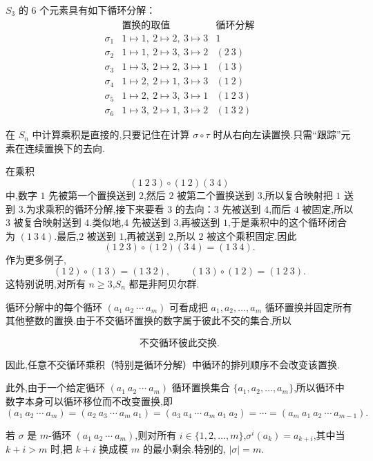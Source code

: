 \begin{example}
	$S_3$ 的 $6$ 个元素具有如下循环分解：
\[
\begin{array}{c|c|c}
	& \text{置换的取值} & \text{循环分解}\\ \hline
	\sigma_1&1\mapsto1,\ 2\mapsto2,\ 3\mapsto3&1\\
	\sigma_2&1\mapsto1,\ 2\mapsto3,\ 3\mapsto2&(2\ 3)\\
	\sigma_3&1\mapsto3,\ 2\mapsto2,\ 3\mapsto1&(1\ 3)\\
	\sigma_4&1\mapsto2,\ 2\mapsto1,\ 3\mapsto3&(1\ 2)\\
	\sigma_5&1\mapsto2,\ 2\mapsto3,\ 3\mapsto1&(1\ 2\ 3)\\
	\sigma_6&1\mapsto3,\ 2\mapsto1,\ 3\mapsto2&(1\ 3\ 2)
\end{array}
\]
\end{example}
在 $S_n$ 中计算乘积是直接的,只要记住在计算 $\sigma\circ\tau$ 时从右向左读置换.只需“跟踪”元素在连续置换下的去向.

\begin{example}
	在乘积
\[
(1\ 2\ 3)\circ(1\ 2)(3\ 4)
\]
中,数字 $1$ 先被第一个置换送到 $2$,然后 $2$ 被第二个置换送到 $3$,所以复合映射把 $1$ 送到 $3$.为求乘积的循环分解,接下来要看 $3$ 的去向：$3$ 先被送到 $4$,而后 $4$ 被固定,所以 $3$ 被复合映射送到 $4$.类似地,$4$ 先被送到 $3$,再被送到 $1$,于是乘积中的这个循环闭合为 $(1\ 3\ 4)$.最后,$2$ 被送到 $1$,再被送到 $2$,所以 $2$ 被这个乘积固定.因此
\[
(1\ 2\ 3)\circ(1\ 2)(3\ 4)=(1\ 3\ 4).
\]
作为更多例子,
\[
(1\ 2)\circ(1\ 3)=(1\ 3\ 2),\qquad (1\ 3)\circ(1\ 2)=(1\ 2\ 3).
\]
这特别说明,对所有 $n\geq3$,$S_n$ 都是非阿贝尔群.
\end{example}

循环分解中的每个循环 $(a_1\ a_2\ \cdots\ a_m)$ 可看成把 $a_1,a_2,\ldots,a_m$ 循环置换并固定所有其他整数的置换.由于不交循环置换的数字属于彼此不交的集合,所以
\begin{proposition}
	\[
\text{不交循环彼此交换.}
\]
\end{proposition}
因此,任意不交循环乘积（特别是循环分解）中循环的排列顺序不会改变该置换.

此外,由于一个给定循环 $(a_1\ a_2\ \cdots\ a_m)$ 循环置换集合 $\{a_1,a_2,\ldots,a_m\}$,所以循环中数字本身可以循环移位而不改变置换,即
\[
(a_1\ a_2\ \cdots\ a_m)=(a_2\ a_3\ \cdots\ a_m\ a_1)=(a_3\ a_4\ \cdots\ a_m\ a_1\ a_2)=\cdots=(a_m\ a_1\ a_2\ \cdots\ a_{m-1}).
\]
\begin{lemma}
	若 $\sigma$ 是 $m$-循环 $(a_1\ a_2\ \cdots\ a_m)$,则对所有 $i\in\{1,2,\ldots,m\}$,$\sigma^i(a_k)=a_{k+i}$,其中当 $k+i>m$ 时,把 $k+i$ 换成模 $m$ 的最小剩余.特别的, $|\sigma|=m$.
\end{lemma}

